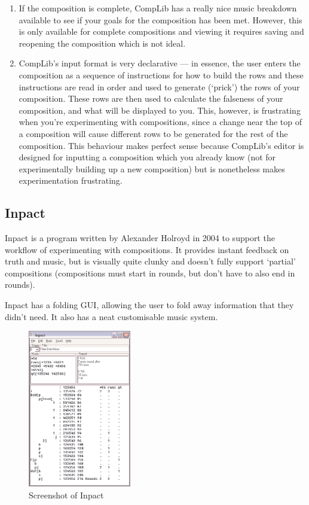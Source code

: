 \documentclass[12pt]{article}
\begin{document}
\begin{enumerate}
    \item If the composition is complete, CompLib has a really nice music breakdown available to see
        if your goals for the composition has been met.  However, this is only available for
        complete compositions and viewing it requires saving and reopening the composition which is
        not ideal.
    \item CompLib's input format is very declarative --- in essence, the user enters the composition
        as a sequence of instructions for how to build the rows and these instructions are read
        in order and used to generate (`prick') the rows of your composition.  These rows are then
        used to calculate the falseness of your composition, and what will be displayed to you.
        This, however, is frustrating when you're experimenting with compositions, since a change
        near the top of a composition will cause different rows to be generated for the rest of the
        composition.  This behaviour makes perfect sense because CompLib's editor is designed for
        inputting a composition which you already know (not for experimentally building up a new
        composition) but is nonetheless makes experimentation frustrating.
\end{enumerate}

\subsection{Inpact}

Inpact is a program written by Alexander Holroyd in 2004 to support the workflow of experimenting
with compositions.  It provides instant feedback on truth and music, but is visually quite clunky
and doesn't fully support `partial' compositions (compositions must start in rounds, but don't have
to also end in rounds).

Inpact has a folding GUI, allowing the user to fold away information that they didn't need.  It also
has a neat customisable music system.

\begin{figure}
    \centering
    \includegraphics[width=0.4\textwidth]{inpact}
    \caption{Screenshot of Inpact}
\end{figure}
\end{document}
